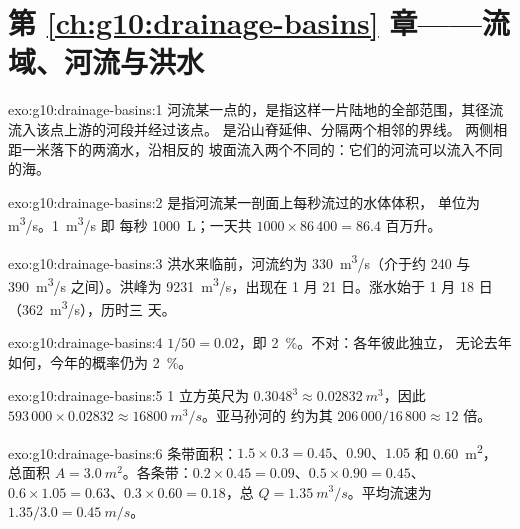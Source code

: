 \section*{第 \ref{ch:g10:drainage-basins} 章——流域、河流与洪水}

\begin{solution}{exo:g10:drainage-basins:1}
河流某一点的，是指这样一片陆地的全部范围，其径流
流入该点上游的河段并经过该点。
是沿山脊延伸、分隔两个相邻的界线。
两侧相距一米落下的两滴水，沿相反的
坡面流入两个不同的：它们的河流可以流入不同的海。
\end{solution}

\begin{solution}{exo:g10:drainage-basins:2}
是指河流某一剖面上每秒流过的水体体积，
单位为 \unit{m^3/s}。\qty{1}{m^3/s} 即
每秒 \qty{1000}{L}；一天共 $1000 \times 86\,400 = 86.4$ 百万升。
\end{solution}

\begin{solution}{exo:g10:drainage-basins:3}
洪水来临前，河流约为 \qty{330}{m^3/s}（介于约
\num{240} 与 \qty{390}{m^3/s} 之间）。洪峰为 \qty{9231}{m^3/s}，出现在
1 月 21 日。涨水始于 1 月 18 日（\qty{362}{m^3/s}），历时三
天。
\end{solution}

\begin{solution}{exo:g10:drainage-basins:4}
$1/50 = 0.02$，即 \qty{2}{\percent}。不对：各年彼此独立，
无论去年如何，今年的概率仍为 \qty{2}{\percent}。
\end{solution}

\begin{solution}{exo:g10:drainage-basins:5}
1 立方英尺为 $0.3048^3 \approx \qty{0.02832}{m^3}$，因此
$593\,000 \times 0.02832 \approx \qty{16800}{m^3/s}$。亚马孙河的
约为其 $206\,000/16\,800 \approx 12$ 倍。
\end{solution}

\begin{solution}{exo:g10:drainage-basins:6}
条带面积：$1.5 \times 0.3 = 0.45$、$0.90$、$1.05$ 和 \qty{0.60}{m^2}，
总面积 $A = \qty{3.0}{m^2}$。各条带：$0.2 \times 0.45 = 0.09$、$0.5 \times 0.90
= 0.45$、$0.6 \times 1.05 = 0.63$、$0.3 \times 0.60 = 0.18$，总 $Q =
\qty{1.35}{m^3/s}$。平均流速为 $1.35/3.0 = \qty{0.45}{m/s}$。
\end{solution}


